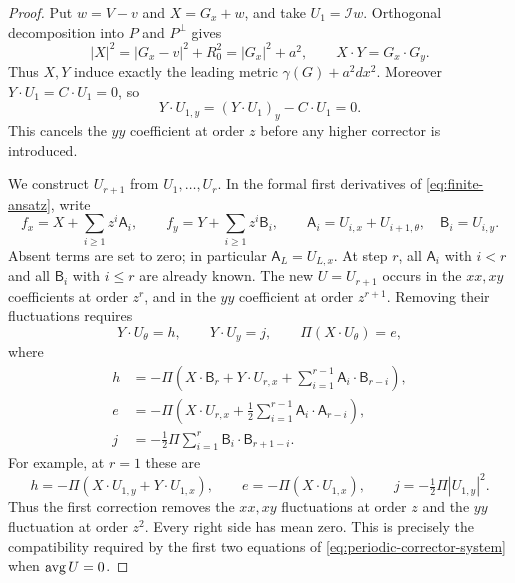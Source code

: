 \begin{proof}
Put $w=V-v$ and $X=G_x+w$, and take $U_1=\mathcal Iw$.  Orthogonal
decomposition into $P$ and $P^\perp$ gives
\[
 |X|^2=|G_x-v|^2+R_0^2=|G_x|^2+a^2,
 \qquad X\cdot Y=G_x\cdot G_y.
\]
Thus $X,Y$ induce exactly the leading metric
$\gamma(G)+a^2dx^2$.  Moreover $Y\cdot U_1=C\cdot U_1=0$, so
\begin{equation}
 Y\cdot U_{1,y}=(Y\cdot U_1)_y-C\cdot U_1=0.
 \label{eq:first-yy-cancellation}
\end{equation}
This cancels the $yy$ coefficient at order $z$ before any higher corrector
is introduced.

We construct $U_{r+1}$ from $U_1,\ldots,U_r$.  In the formal first
derivatives of \eqref{eq:finite-ansatz}, write
\[
 f_x=X+\sum_{i\ge1}z^i\mathsf A_i,
 \qquad f_y=Y+\sum_{i\ge1}z^i\mathsf B_i,
 \qquad
 \mathsf A_i=U_{i,x}+U_{i+1,\theta},\quad
 \mathsf B_i=U_{i,y}.
\]
Absent terms are set to zero; in particular $\mathsf A_L=U_{L,x}$.
At step $r$, all $\mathsf A_i$ with $i<r$ and all $\mathsf B_i$ with
$i\le r$ are already known.  The new $U=U_{r+1}$ occurs in the $xx,xy$
coefficients at order $z^r$, and in the $yy$ coefficient at order
$z^{r+1}$.  Removing their fluctuations requires
\begin{equation}
 Y\cdot U_\theta=h,\qquad
 Y\cdot U_y=j,\qquad
 \Pi(X\cdot U_\theta)=e,
 \label{eq:periodic-corrector-system}
\end{equation}
where
\begin{align}
 h&=-\Pi\left(X\cdot\mathsf B_r+Y\cdot U_{r,x}
             +\sum_{i=1}^{r-1}\mathsf A_i\cdot\mathsf B_{r-i}\right),
       \label{eq:periodic-rhs-h}\\
 e&=-\Pi\left(X\cdot U_{r,x}
             +\frac12\sum_{i=1}^{r-1}
                        \mathsf A_i\cdot\mathsf A_{r-i}\right),
       \label{eq:periodic-rhs-e}\\
 j&=-\frac12\Pi\sum_{i=1}^{r}
                         \mathsf B_i\cdot\mathsf B_{r+1-i}.
       \label{eq:periodic-rhs-j}
\end{align}
For example, at $r=1$ these are
\[
 h=-\Pi(X\cdot U_{1,y}+Y\cdot U_{1,x}),\qquad
 e=-\Pi(X\cdot U_{1,x}),\qquad
 j=-\tfrac12\Pi|U_{1,y}|^2.
\]
Thus the first correction removes the $xx,xy$ fluctuations at order $z$
and the $yy$ fluctuation at order $z^2$.  Every right side has mean zero.
This is precisely the compatibility required by the first two equations
of \eqref{eq:periodic-corrector-system} when $\operatorname{avg} U=0$.


\end{proof}

